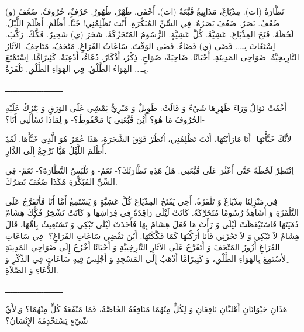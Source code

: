 \documentclass[a5paper]{article}
\begin{document}
نَظَّارَةٌ (ات). مِذْيَاعٌ، مَذَايِيعُ قُبَّعَةٌ (ات). أَخْفَى. \newline
ظَهْرٌ، ظُهُورٌ. حَرْفٌ، حُرُوفٌ. ضَعُفَ (و) ضُعْفٌ. بَصَرٌ. ضَعُفَ بَصَرُهُ. فِي السِّنِّ المُبَكِّرَةِ. أَنْتَ تَظْلِمُنِي! خَبَّأَ. أَظْلَمَ. أَظْلَمَ اللَّيْلُ. لَحْظَةً. فَتَحَ المِذْيَاعَ. عَشِيَّةٌ. كُلَّ عَشِيَّةٍ. الرُّسُومُ المُتَحَرِّكَةُ. شَخَرَ (ي) شَخِيرٌ. فَكَّكَ. رَكَّبَ. اِسْتَغَاثَ بِـ... قَضَى (ي) قَضَاءٌ. قَضَى الوَقْتَ. سَاعَاتُ الفَرَاغِ. مَتْحَفٌ، مَتَاحِفُ. الآثَارُ التَّارِيخِيَّةُ. ضَوَاحِى المَدِينَةِ. أَحْيَانًا. ضَاحِيَةٌ، ضَوَاحٍ. ذِكْرٌ، أَذْكَارٌ. دُعَاءٌ، أَدْعِيَةٌ. كَثِيرًامَّا. اِسْتَمْتَعَ بِـ... الهَوَاءُ الطَّلْقُ. فِي الهَوَاءِ الطَّلْقِ. تَلْفَزَةٌ.

ــــــــــــــــــــــــ

أَخْفَتْ نَوَالُ وَرَاءَ ظَهْرِهَا شَيْءً وَ قَالَتْ: طَوِيلٌ وَ مَبْرِيٌّ يَمْشِي عَلَى الوَرَقِ وَ يَتْرُكُ عَلَيْهِ الحُرُوفَ مَا هُوَ؟ أَيْنَ قُبَّعَتِي يَا مَحْفُوظُ؟- وَ لِمَاذَا تَسْأَلُنِي أَنَا؟- 

ِلأَنَّكَ خَبَّأْتَهَا- أَنَا مَارَأَيْتُهَا، أَنْتَ تَظْلِمُنِي، اُنْظُرْ فَوْقَ الشَّجَرَةِ، هَذَا عُمَرُ هُوَ الَّذِي خَبَّأَهَا. لَقَدْ أَظْلَمَ اللَّيْلُ هَيَّا نَرْجِعْ إِلَى الدَّارِ. 

اِنْتَظِرْ لَحْظَةً حَتَّى أَعْثُرَ عَلَى قُبَّعَتِي. هَلْ هَذِهِ نَظَّارَتُكَ؟- نَعَمْ- وَ تَلْبَسُ النَّظَّارَةَ؟- نَعَمْ- فِي السِّنِّ المُبَكِّرَةِ هَكَذَا ضَعُفَ بَصَرُكَ. 

فِي مَنْزِلِنَا مِذْيَاعٌ وَ تَلْفَزَةٌ. أَخِي يَفْتَحُ المِذْيَاعَ كُلَّ عَشِيَّةٍ وَ يَسْتَمِعُ أَمَّا أَنَا فَأَتَفَرَّجُ عَلَى التَّلْفَزَةِ وَ أُشَاهِدُ رُسُومًا مُتَحَرِّكَةً. كَانَتْ لَيْلَى رَاقِدَةً فِي فِرَاشِهَا وَ كَانَتْ تَشْخِرُ فَكَّكَ هِشَامٌ دُمْيَتَهَا فَاسْتَيْقَظَتْ لَيْلَى وَ رَأَتْ مَا فَعَلَ هِشَامٌ بِهَا فَأَخَذَتْ لَيْلَى تَبْكِي وَ تَسْتَغِيثُ بِأُمِّهَا، قَالَ هِشَامٌ لاَ تَبْكِي وَ لاَ تَحْزَنِي فَأَنَا أُرَكِّبُهَا كَمَا فَكَّكْتُهَا. أَيْنَ تَقْضِي سَاعَاتِ الفَرَاغِ؟- فِي سَاعَاتِ الفَرَاغِ أَزُورُ المَتْحَفَ وَ أَتَفَرَّجُ عَلَى الآثَارِ التَّارِخِييَّةِ وَ أَحْيَانًا أَخْرُجُ إِلَى ضَوَاحِي المَدِينَةِ ِلأَسْتَمِعَ بِالهَوَاءِ الطَّلْقِ، وَ كَثِيرًامَّا أَذْهَبُ إِلَى المَسْجِدِ وَ أَجْلِسُ فِيهِ سَاعَاتٍ فِي الذِّكْرِ وَ الدُّعَاءِ وَ الصَّلاَةِ.

ــــــــــــــــــــــــ

هَذَانِ حَيْوَانَانِ أَهْليَّانِ نَافِعَانِ وَ لِكُلٍّ مِنْهُمَا مَنَافِعُهُ الخَاصَّةُ، فَمَا مَنْفَعَةُ كُلٍّ مِنْهُمَا؟ وَ ِلأَيِّ شّيْءٍ يَسْتَخْدِمُهُ الإِنْسَانُ؟
\end{document}
